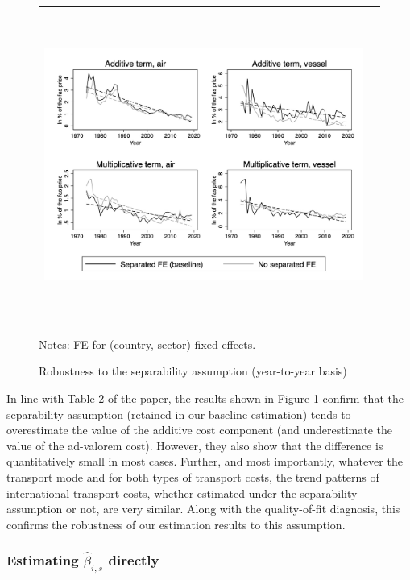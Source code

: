 \documentclass[11pt,twoside, authoryear]{elsarticle}
\begin{document}
\begin{figure}[htbp]
\caption{Robustness to the separability assumption (year-to-year basis)}
\label{fig:robustesse_non_separe}
\begin{center}
\begin{tabular}{cc}
\includegraphics[width=6in, height=4in]{graph_robustesse_ns.jpg}

\end{tabular}
\end{center}
\begin{minipage} [c]  {5in} \scriptsize%
Notes: FE for (country, sector) fixed effects.
\end{minipage}
\end{figure}

In line with Table 2 of the paper, the results shown in Figure \ref{fig:robustesse_non_separe} confirm that the separability assumption (retained in our baseline estimation) tends to overestimate the value of the additive cost component (and underestimate the value of the ad-valorem cost).
However, they also show that the difference is quantitatively small in most cases. Further, and most importantly, whatever the transport mode and for both types of transport costs, the trend patterns of international transport costs, whether estimated under the separability assumption or not, are very similar. Along with the quality-of-fit diagnosis, this confirms the robustness of our estimation results to this assumption.




\subsubsection{Estimating $\widehat{\beta}_{i,s}$ directly}
	
\end{document}
